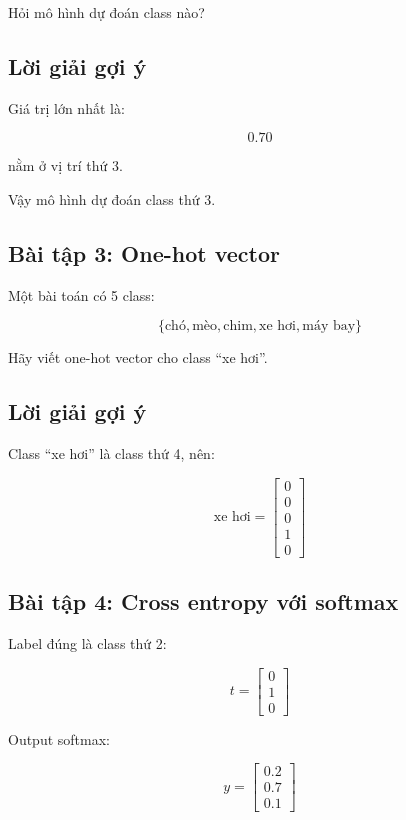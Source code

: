 Hỏi mô hình dự đoán class nào?

\subsection*{Lời giải gợi ý}

Giá trị lớn nhất là:

\[
    0.70
\]

nằm ở vị trí thứ 3.

Vậy mô hình dự đoán class thứ 3.

\subsection*{Bài tập 3: One-hot vector}

Một bài toán có 5 class:

\[
    \{\text{chó}, \text{mèo}, \text{chim}, \text{xe hơi}, \text{máy bay}\}
\]

Hãy viết one-hot vector cho class ``xe hơi''.

\subsection*{Lời giải gợi ý}

Class ``xe hơi'' là class thứ 4, nên:

\[
    \text{xe hơi}
    =
    \begin{bmatrix}
    0\\
    0\\
    0\\
    1\\
    0
    \end{bmatrix}
\]

\subsection*{Bài tập 4: Cross entropy với softmax}

Label đúng là class thứ 2:

\[
    t =
    \begin{bmatrix}
    0\\
    1\\
    0
    \end{bmatrix}
\]

Output softmax:

\[
    y =
    \begin{bmatrix}
    0.2\\
    0.7\\
    0.1
    \end{bmatrix}
\]

